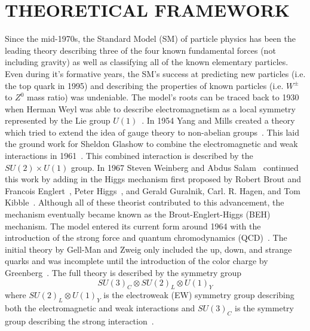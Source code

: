 %
%
%


\chapter{\texorpdfstring{\uppercase {Theoretical Framework}}{Theoretical Framework}}
\label{ch:theoretical_framework}

Since the mid-1970s, the Standard Model (SM) of particle physics has been the leading theory describing three of the four known fundamental forces (not including gravity) as well as classifying all of the known elementary particles.
Even during it's formative years, the SM's success at predicting new particles (i.e. the top quark in 1995) and describing the properties of known particles (i.e. $W^{\pm}$ to $Z^{0}$ mass ratio) was undeniable.
The model's roots can be traced back to 1930 when Herman Weyl was able to describe electromagnetism as a local symmetry represented by the Lie group $U\left(1\right)$~\cite{Weyl1929}.
In 1954 Yang and Mills created a theory which tried to extend the idea of gauge theory to non-abelian groups~\cite{PhysRev.96.191}.
This laid the ground work for Sheldon Glashow to combine the electromagnetic and weak interactions in 1961~\cite{GLASHOW1961579}.
This combined interaction is described by the $SU\left(2\right){\times}U\left(1\right)$ group.
In 1967 Steven Weinberg and Abdus Salam~\cite{PhysRevLett.19.1264,salam1968} continued this work by adding in the Higgs mechanism first proposed by Robert Brout and Francois Englert~\cite{PhysRevLett.13.321}, Peter Higgs~\cite{PhysRevLett.13.508,Higgs:1966ev}, and Gerald Guralnik, Carl. R. Hagen, and Tom Kibble~\cite{PhysRevLett.13.585,Kibble:1967sv}.
Although all of these theorist contributed to this advancement, the mechanism eventually became known as the Brout-Englert-Higgs (BEH) mechanism.
The model entered its current form around 1964 with the introduction of the strong force and quantum chromodynamics (QCD)~\cite{Neeman:1961jhl,GellMann:1962xb,GellMann:1964nj,Zweig:1981pd,Fritzsch:1972jv}.
The initial theory by Gell-Man and Zweig only included the up, down, and strange quarks and was incomplete until the introduction of the color charge by Greenberg~\cite{PhysRevLett.13.598}.
The full theory is described by the symmetry group
\begin{equation}\label{eq:standard_model_symmetry_group}
SU\left(3\right)_{C}{\otimes}SU\left(2\right)_{L}{\otimes}U\left(1\right)_{Y}
\end{equation}
where $SU\left(2\right)_{L}{\otimes}U\left(1\right)_{Y}$ is the electroweak (EW) symmetry group describing both the electromagnetic and weak interactions and $SU\left(3\right)_{C}$ is the symmetry group describing the strong interaction~\cite{Burgess2007,Aitchison2012}.


